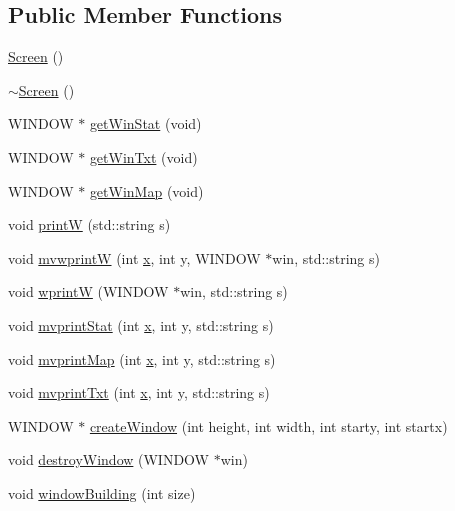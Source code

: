 \subsection*{Public Member Functions}
\begin{DoxyCompactItemize}
\item 
\hyperlink{class_screen_ae7576476fc6e6a6eaa66389fdc41fe72}{Screen} ()
\item 
\hyperlink{class_screen_a4243bc17596af96415b09ac48205676d}{$\sim$\-Screen} ()
\item 
W\-I\-N\-D\-O\-W $\ast$ \hyperlink{class_screen_a131601376963fcab68a8f7ef02e3281e}{get\-Win\-Stat} (void)
\item 
W\-I\-N\-D\-O\-W $\ast$ \hyperlink{class_screen_a2e754a3bcfae0a3cc538c15a2baac538}{get\-Win\-Txt} (void)
\item 
W\-I\-N\-D\-O\-W $\ast$ \hyperlink{class_screen_a42b0ea21964277da3bd002272516ee36}{get\-Win\-Map} (void)
\item 
void \hyperlink{class_screen_a42954768bab95ae4e7bfa63b87c86ad1}{print\-W} (std\-::string s)
\item 
void \hyperlink{class_screen_aac332d2947f79b8ba46fe9bdb002b1a2}{mvwprint\-W} (int \hyperlink{jquery_8js_a4c3eadaa5164016d2c340d495fc6e55e}{x}, int y, W\-I\-N\-D\-O\-W $\ast$win, std\-::string s)
\item 
void \hyperlink{class_screen_aed5c12f368ee1b905d217a644cd32cc5}{wprint\-W} (W\-I\-N\-D\-O\-W $\ast$win, std\-::string s)
\item 
void \hyperlink{class_screen_a5719de9e2095d34c0e7646e7b295666a}{mvprint\-Stat} (int \hyperlink{jquery_8js_a4c3eadaa5164016d2c340d495fc6e55e}{x}, int y, std\-::string s)
\item 
void \hyperlink{class_screen_aacb2693698db096eab7c67aa554725bd}{mvprint\-Map} (int \hyperlink{jquery_8js_a4c3eadaa5164016d2c340d495fc6e55e}{x}, int y, std\-::string s)
\item 
void \hyperlink{class_screen_ae34eb75a4dfd8a349d744f28a34c58cc}{mvprint\-Txt} (int \hyperlink{jquery_8js_a4c3eadaa5164016d2c340d495fc6e55e}{x}, int y, std\-::string s)
\item 
W\-I\-N\-D\-O\-W $\ast$ \hyperlink{class_screen_ad1610903a0204f2c647792b412244b5e}{create\-Window} (int height, int width, int starty, int startx)
\item 
void \hyperlink{class_screen_a940749b56f1a6588ae7463579bc5684c}{destroy\-Window} (W\-I\-N\-D\-O\-W $\ast$win)
\item 
void \hyperlink{class_screen_ad2a582f8fcfb4ac19493fed84d412ee8}{window\-Building} (int size)

\end{DoxyCompactItemize}

